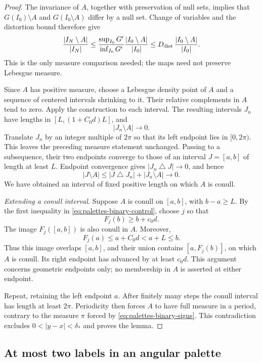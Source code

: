 \begin{proof}
The invariance of \(A\), together with preservation of null sets,
implies that \(G(I_0)\setminus A\) and \(G(I_0\setminus A)\)
differ by a null set.  Change of variables and the distortion
bound therefore give
\[
 \frac{|I_N\setminus A|}{|I_N|}
 \le
 \frac{\sup_{I_0}G'}{\inf_{I_0}G'}
       \frac{|I_0\setminus A|}{|I_0|}
 \le D_{\rm dist}\,\frac{|I_0\setminus A|}{|I_0|}.
\]
This is the only measure comparison needed; the maps need not
preserve Lebesgue measure.

Since \(A\) has positive measure, choose a Lebesgue density point
of \(A\) and a sequence of centered intervals shrinking to it.
Their relative complements in \(A\) tend to zero.  Apply the
construction to each interval.  The resulting intervals \(J_n\)
have lengths in \([L,(1+C_0d)L]\), and
\[
 |J_n\setminus A|\longrightarrow0.
\]
Translate \(J_n\) by an integer multiple of \(2\pi\) so that its
left endpoint lies in \([0,2\pi)\).  This leaves the preceding
measure statement unchanged.  Passing to a subsequence, their
two endpoints converge to those of an interval \(J=[a,b]\) of
length at least \(L\).  Endpoint convergence gives
\(|J_n\mathbin{\triangle}J|\to0\), and hence
\[
 |J\setminus A|
 \le |J\mathbin{\triangle}J_n|+|J_n\setminus A|
 \longrightarrow0.
\]
We have obtained an interval of fixed positive length on which
\(A\) is conull.

\smallskip
\noindent\emph{Extending a conull interval.}
Suppose \(A\) is conull on \([a,b]\), with \(b-a\ge L\).
By the first inequality in \eqref{eq:palettes-binary-control},
choose \(j\) so that
\[
 F_j(b)\ge b+c_0d.
\]
The image \(F_j([a,b])\) is also conull in \(A\).
Moreover,
\[
 F_j(a)\le a+C_0d<a+L\le b.
\]
Thus this image overlaps \([a,b]\), and their union contains
\([a,F_j(b)]\), on which \(A\) is conull.  Its right endpoint
has advanced by at least \(c_0d\).  This argument concerns
geometric endpoints only; no membership in \(A\) is asserted
at either endpoint.

Repeat, retaining the left endpoint \(a\).  After finitely
many steps the conull interval has length at least \(2\pi\).
Periodicity then forces \(A\) to have full measure in a period,
contrary to the measure \(\pi\) forced by
\eqref{eq:palettes-binary-signs}.  This contradiction excludes
\(0<|y-x|<\delta_*\) and proves the lemma.
\end{proof}

\subsection{At most two labels in an angular palette}

